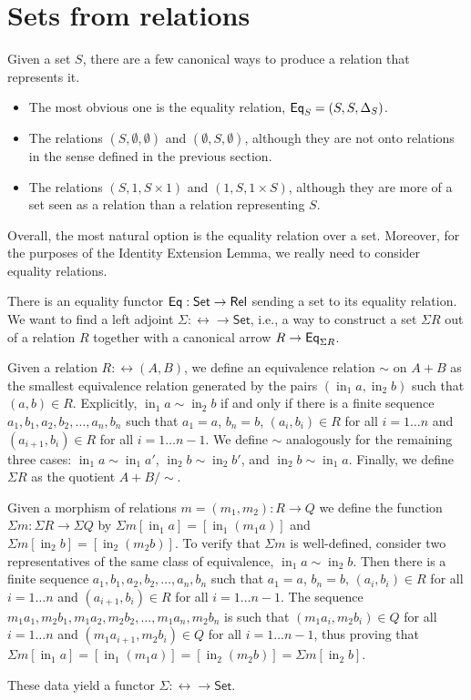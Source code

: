 \documentclass{lmcs}
\theoremstyle{plain}\newtheorem{satz}[thm]{Satz}
\newcommand{\set}{\mathsf{Set}}
\DeclareMathOperator{\SumIn}{in}
\begin{document}
\section{Sets from relations}

Given a set $S$, there are a few canonical ways to produce a relation that represents it.
\begin{itemize}
\item The most obvious one is the equality relation, $\mathsf{Eq}_S = (S, S, \Delta_S)$.
\item The relations $(S, \emptyset, \emptyset)$ and $(\emptyset, S, \emptyset)$, although they are not onto relations in the sense defined in the previous section.
\item The relations $(S, 1, S \times 1)$ and $(1, S, 1 \times S)$, although they are more of a set seen as a relation than a relation representing $S$.
\end{itemize}
Overall, the most natural option is the equality relation over a set.
Moreover, for the purposes of the Identity Extension Lemma, we really need to consider equality relations.

There is an equality functor $\Eq : \set \to \rel$ sending a set to its equality relation.
We want to find a left adjoint $\Sigma : \rel \to \set$, i.e., a way to construct a set $\Sigma{R}$ out of a relation $R$ together with a canonical arrow $R \to \mathsf{Eq}_{\Sigma{R}}$.

\begin{defi}
Given a relation $R : \rel(A, B)$, we define an equivalence relation $\sim$ on $A + B$ as the smallest equivalence relation generated by the pairs $(\SumIn_1 a, \SumIn_2 b)$ such that $(a, b) \in R$.
Explicitly, $\SumIn_1 a \sim \SumIn_2 b$ if and only if there is a finite sequence $a_1, b_1, a_2, b_2, \dots, a_n, b_n$ such that $a_1 = a$, $b_n = b$, $(a_i, b_i) \in R$ for all $i = 1 \dots n$ and $(a_{i + 1}, b_i) \in R$ for all $i = 1 \dots n - 1$.
We define $\sim$ analogously for the remaining three cases: $\SumIn_1 a \sim \SumIn_1 a'$, $\SumIn_2 b \sim \SumIn_2 b'$, and $\SumIn_2 b \sim \SumIn_1 a$.
Finally, we define $\Sigma{R}$ as the quotient $A + B / \sim$.

Given a morphism of relations $m = (m_1, m_2) : R \to Q$ we define the function $\Sigma{m} : \Sigma{R} \to \Sigma{Q}$ by $\Sigma{m}[\SumIn_1 a] = [ \SumIn_1 (m_1 a) ]$ and $\Sigma{m}[\SumIn_2 b] = [\SumIn_2 (m_2 b)]$.
To verify that $\Sigma{m}$ is well-defined, consider two representatives of the same class of equivalence, $\SumIn_1 a \sim \SumIn_2 b$.
Then there is a finite sequence $a_1, b_1, a_2, b_2, \dots, a_n, b_n$ such that $a_1 = a$, $b_n = b$, $(a_i, b_i) \in R$ for all $i = 1 \dots n$ and $(a_{i + 1}, b_{i}) \in R$ for all $i = 1 \dots n - 1$.
The sequence $m_1 a_1, m_2 b_1, m_1 a_2, m_2 b_2, \dots, m_1 a_n, m_2 b_n$ is such that $(m_1 a_i, m_2 b_i) \in Q$ for all $i = 1 \dots n$ and $(m_1 a_{i + 1}, m_2 b_{i}) \in Q$ for all $i = 1 \dots n - 1$, thus proving that $\Sigma{m}[\SumIn_1 a] = [\SumIn_1 (m_1 a)] = [\SumIn_2 (m_2 b)] = \Sigma{m}[\SumIn_2 b]$.

These data yield a functor $\Sigma : \rel \to \set$.
\end{defi}
\end{document}
